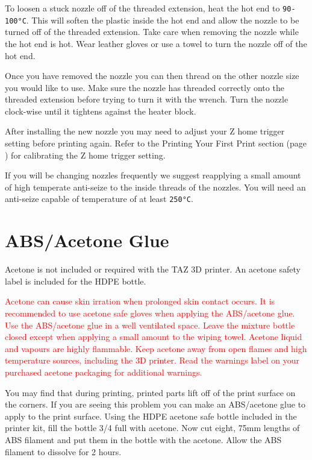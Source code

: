 To loosen a stuck nozzle off of the threaded extension, heat the hot end to \texttt{90-100°C}. This will soften the plastic inside the hot end and allow the nozzle to be turned off of the threaded extension. Take care when removing the nozzle while the hot end is hot. Wear leather gloves or use a towel to turn the nozzle off of the hot end.

Once you have removed the nozzle you can then thread on the other nozzle size you would like to use. Make sure the nozzle has threaded correctly onto the threaded extension before trying to turn it with the wrench. Turn the nozzle clock-wise until it tightens against the heater block.

After installing the new nozzle you may need to adjust your Z home trigger setting before printing again. Refer to the Printing Your First Print section (page \pageref{firstprint}) for calibrating the Z home trigger setting.

If you will be changing nozzles frequently we suggest reapplying a small amount of high temperate anti-seize to the inside threads of the nozzles. You will need an anti-seize capable of temperature of at least \texttt{250°C}.

\section{ABS/Acetone Glue}
Acetone is not included or required with the TAZ 3D printer. An acetone safety label is included for the HDPE bottle.

\textcolor{red}{Acetone can cause skin irration when prolonged skin contact occurs. It is recommended to use acetone safe gloves when applying the ABS/acetone glue. Use the ABS/acetone glue in a well ventilated space. Leave the mixture bottle closed except when applying a small amount to the wiping towel. Acetone liquid and vapours are highly flammable. Keep acetone away from open flames and high temperature sources, including the 3D printer. Read the warnings label on your purchased acetone packaging for additional warnings.}

You may find that during printing, printed parts lift off of the print surface on the corners. If you are seeing this problem you can make an ABS/acetone glue to apply to the print surface. Using the HDPE acetone safe bottle included in the printer kit, fill the bottle 3/4 full with acetone. Now cut eight, 75mm lengths of ABS filament and put them in the bottle with the acetone. Allow the ABS filament to dissolve for 2 hours.

